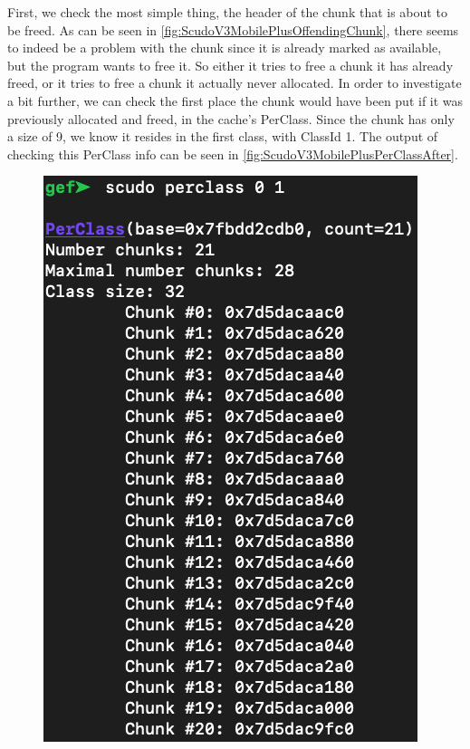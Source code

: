 \documentclass[a4paper,11pt,oneside]{report}
\begin{document}
First, we check the most simple thing, the header of the chunk that is about
to be freed. As can be seen in \autoref{fig:ScudoV3MobilePlusOffendingChunk},
there seems to indeed be a problem with the chunk since it is already marked
as available, but the program wants to free it. So either it tries to free a
chunk it has already freed, or it tries to free a chunk it actually never
allocated. In order to investigate a bit further, we can check the first place
the chunk would have been put if it was previously allocated and freed, in the
cache's PerClass. Since the chunk has only a size of 9, we know it resides in
the first class, with ClassId 1. The output of checking this PerClass info can
be seen in \autoref{fig:ScudoV3MobilePlusPerClassAfter}.

\begin{figure}[h!]
\centering
\begin{minipage}{.5\textwidth}
  \centering
  \includegraphics[width=.95\linewidth]{figures/ScudoV3MobilePlusPerClassAfter.png}

\end{minipage}
\end{figure}
\end{document}
